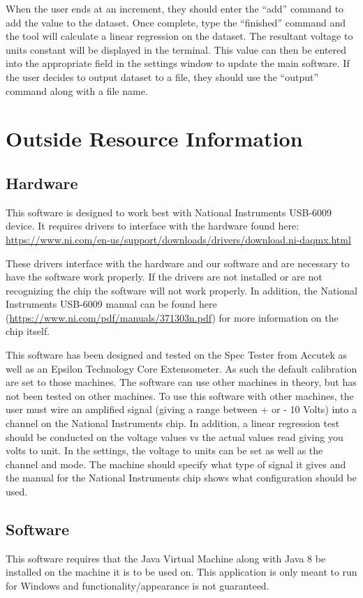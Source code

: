 \documentclass[12pt,letterpaper, USenglish]{article}
\theoremstyle{definition}
\numberwithin{theorem}{section}
\numberwithin{lemma}{section}
\numberwithin{corollary}{section}
\numberwithin{definition}{section}
\numberwithin{example}{section}
\numberwithin{equation}{theorem}
\begin{document}
When the user ends at an increment, they should enter the ``add'' command to add the value to the dataset. Once complete, type the ``finished'' command and the tool will calculate a linear regression on the dataset. The resultant voltage to units constant will be displayed in the terminal. This value can then be entered into the appropriate field in the settings window to update the main software. If the user decides to output dataset to a file, they should use the ``output'' command along with a file name. 

\section{Outside Resource Information} \label{resourceSection}

\subsection{Hardware}
This software is designed to work best with National Instruments USB-6009 device. It requires drivers to interface with the hardware found here:
\url{https://www.ni.com/en-us/support/downloads/drivers/download.ni-daqmx.html}

These drivers interface with the hardware and our software and are necessary to have the software work properly. If the drivers are not installed or are not recognizing the chip the software will not work properly. In addition, the National Instruments USB-6009 manual can be found here (\url{https://www.ni.com/pdf/manuals/371303n.pdf}) for more information on the chip itself. 

This software has been designed and tested on the Spec Tester from Accutek as well as an Epsilon Technology Core Extensometer. As such the default calibration are set to those machines. The software can use other machines in theory, but has not been tested on other machines. To use this software with other machines, the user must wire an amplified signal (giving a range between + or - 10 Volts) into a channel on the National Instruments chip. In addition, a linear regression test should be conducted on the voltage values vs the actual values read giving you volts to unit. In the settings, the voltage to units can be set as well as the channel and mode. The machine should specify what type of signal it gives and the manual for the National Instruments chip shows what configuration should be used.  

\subsection{Software}
This software requires that the Java Virtual Machine along with Java 8 be installed on the machine it is to be used on. This application is only meant to run for Windows and functionality/appearance is not guaranteed.
\end{document}
